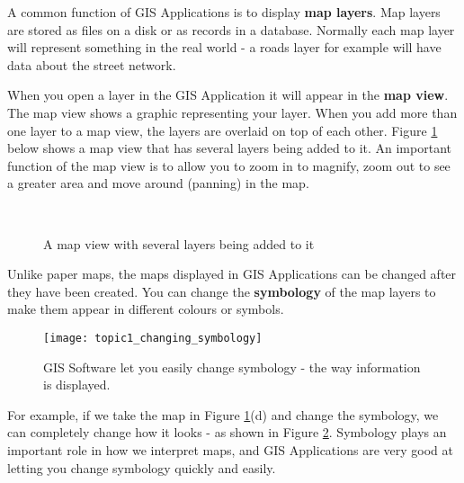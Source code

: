 A common function of GIS Applications is to display \textbf{map layers}. Map
layers are stored as files on a disk or as records in a database. Normally
each map layer will represent something in the real world - a roads layer for
example will have data about the street network. 

When you open a layer in the GIS Application it will appear in the
\textbf{map view}. The map view shows a graphic representing your layer. When
you add more than one layer to a map view, the layers are overlaid on top of
each other. Figure \ref{fig:addlayer} below shows a map view that has several
layers being added to it. An important function of the map view is to allow
you to zoom in to magnify, zoom out to see a greater area and move around
(panning) in the map.

\begin{figure}[ht]
\centering
\caption{A map view with several layers being added to it}\label{fig:addlayer}
   \goodgap
   \\
   \goodgap
\end{figure}

Unlike paper maps, the maps displayed in GIS Applications can be changed
after they have been created. You can change the \textbf{symbology} of the
map layers to make them appear in different colours or symbols. 

\begin{figure}[ht]
\begin{center}
   \caption{GIS Software let you easily change symbology - the way
   information is displayed.}
   \label{fig:changesymbology}\smallskip
   \texttt{[image: topic1\_changing\_symbology]}
\end{center}
\end{figure}

For example, if we take the map in Figure \ref{fig:addlayer}(d) and change
the symbology, we can completely change how it looks - as shown in Figure
\ref{fig:changesymbology}. Symbology plays an important role in how we
interpret maps, and GIS Applications are very good at letting you change
symbology quickly and easily.


